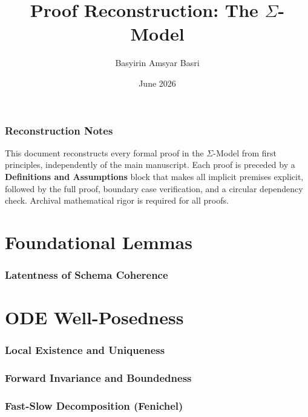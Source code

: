 \documentclass[manuscript,screen]{jair}
\title{\texorpdfstring{Proof Reconstruction: The $\Sigma$-Model}{Proof Reconstruction: The Sigma-Model}}
\author{Basyirin Amsyar Basri}
\date{June 2026}
\begin{document}
\maketitle
{}

\tableofcontents

\section*{Reconstruction Notes}

This document reconstructs every formal proof in the $\Sigma$-Model from first
principles, independently of the main manuscript. Each proof is preceded
by a \textbf{Definitions and Assumptions} block that makes all implicit
premises explicit, followed by the full proof, boundary case verification,
and a circular dependency check.
Archival mathematical rigor is required for all proofs.

\newpage

\part{Foundational Lemmas}

\section{Latentness of Schema Coherence}


\part{ODE Well-Posedness}

\section{Local Existence and Uniqueness}


\section{Forward Invariance and Boundedness}


\section{Fast-Slow Decomposition (Fenichel)}

\end{document}
